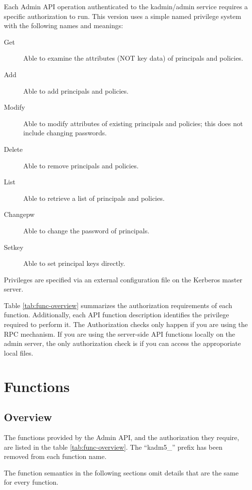 Each Admin API operation authenticated to the kadmin/admin service
requires a specific authorization to run.  This version uses a simple
named privilege system with the following names and meanings:

\begin{description}
\item[Get] Able to examine the attributes (NOT key data) of principals
and policies. 
\item[Add] Able to add principals and policies.
\item[Modify] Able to modify attributes of existing principals and
policies; this does not include changing passwords.
\item[Delete] Able to remove principals and policies.
\item[List] Able to retrieve a list of principals and policies.
\item[Changepw] Able to change the password of principals.
\item[Setkey] Able to set principal keys directly.
\end{description}

Privileges are specified via an external configuration file on the
Kerberos master server.

Table \ref{tab:func-overview} summarizes the authorization
requirements of each function.  Additionally, each API function
description identifies the privilege required to perform it.  The
Authorization checks only happen if you are using the RPC mechanism.
If you are using the server-side API functions locally on the admin
server, the only authorization check is if you can access the
approporiate local files.

\section{Functions}

\subsection{Overview}

The functions provided by the Admin API, and the authorization they
require, are listed in the table \ref{tab:func-overview}.  The
``kadm5_'' prefix has been removed from each function name.

The function semantics in the following sections omit details that are
the same for every function.

